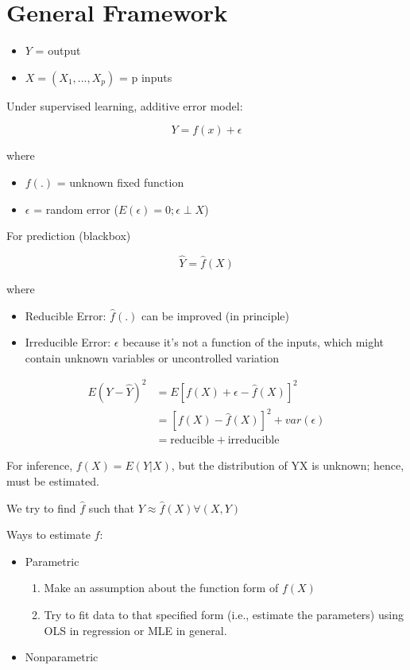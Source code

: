 \documentclass[
]{book}
\begin{document}
\hypertarget{general-framework}{%
\section{General Framework}\label{general-framework}}

\begin{itemize}
\item
  \(Y\) = output
\item
  \(X = (X_1,...,X_p)\) = p inputs
\end{itemize}

Under supervised learning, additive error model:

\[
Y = f(x) + \epsilon
\]

where

\begin{itemize}
\item
  \(f(.)\) = unknown fixed function
\item
  \(\epsilon\) = random error (\(E(\epsilon) = 0; \epsilon \perp X\))
\end{itemize}

For prediction (blackbox)

\[
\hat{Y} = \hat{f}(X)
\]

where

\begin{itemize}
\item
  Reducible Error: \(\hat{f}(.)\) can be improved (in principle)
\item
  Irreducible Error: \(\epsilon\) because it's not a function of the inputs, which might contain unknown variables or uncontrolled variation
\end{itemize}

\[
\begin{aligned}
E(Y - \hat{Y})^2 &= E[f(X) + \epsilon - \hat{f}(X)]^2 \\
&= [f(X) - \hat{f}(X)]^2 + var(\epsilon) \\
&= \text{reducible} + \text{irreducible}
\end{aligned}
\]

For inference, \(f(X) = E(Y|X)\), but the distribution of Y\textbar X is unknown; hence, must be estimated.

We try to find \(\hat{f}\) such that \(Y \approx \hat{f}(X) \forall (X,Y)\)

Ways to estimate \(f\):

\begin{itemize}
\item
  Parametric

  \begin{enumerate}
  \def\labelenumi{\arabic{enumi}.}
  \item
    Make an assumption about the function form of \(f(X)\)
  \item
    Try to fit data to that specified form (i.e., estimate the parameters) using OLS in regression or MLE in general.
  \end{enumerate}
\item
  Nonparametric
\end{itemize}
\end{document}
